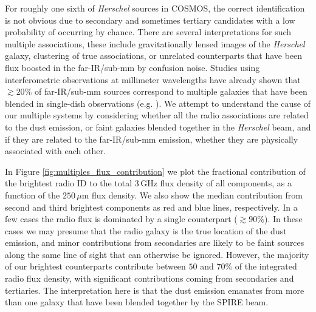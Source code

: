 For roughly one sixth of \textit{Herschel} sources in COSMOS, the correct identification is not obvious due to secondary and sometimes tertiary candidates with a low probability of occurring by chance. There are several interpretations for such multiple associations, these include gravitationally lensed images of the \textit{Herschel} galaxy, clustering of true associations, or  unrelated counterparts that have been flux boosted in the far-IR/sub-mm by confusion noise. Studies using interferometric observations at millimeter wavelengths have already shown that $\gtrsim 20\%$ of far-IR/sub-mm sources correspond to multiple galaxies that have been blended in single-dish observations (e.g. \citealt{Karim_2013, Simpson_2015, Stach_2018}). We attempt to understand the cause of our multiple systems by considering whether all the radio associations are related to the dust emission, or faint galaxies blended together in the \textit{Herschel} beam, and if they are related to the far-IR/sub-mm emission, whether they are physically associated with each other.

In Figure \ref{fig:multiples_flux_contribution} we plot the fractional contribution of the brightest radio ID to the total $3\,$GHz flux density of all components, as a function of the $250\,\mu$m flux density. We also show the median contribution from second and third brightest components as red and blue lines, respectively. In a few cases the radio flux is dominated by a single counterpart ($\gtrsim 90\%$). In these cases we may presume that the radio galaxy is the true location of the dust emission, and minor contributions from secondaries are likely to be faint sources along the same line of sight that can otherwise be ignored. However, the majority of our brightest counterparts contribute between $50$ and $70\%$ of the integrated radio flux density, with significant contributions coming from secondaries and tertiaries. The interpretation here is that the dust emission emanates from more than one galaxy that have been blended together by the SPIRE beam.

